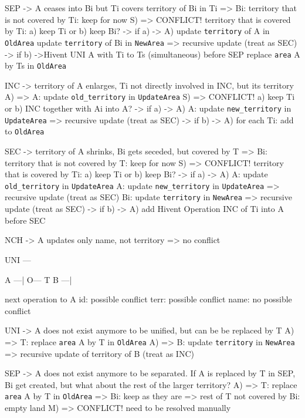   SEP -> A ceases into Bi but Ti covers territory of Bi in Ti
      => Bi: territory that is not covered by Ti: keep for now
S)    => CONFLICT! territory that is covered by Ti: a) keep Ti or b) keep Bi?
      -> if a)
-> A)   update \texttt{territory} of A in \texttt{OldArea}
        update \texttt{territory} of Bi in \texttt{NewArea}
        => recursive update (treat as SEC)
      -> if b)
->Hivent UNI A with Ti to Ts (simultaneous) before SEP
        replace \texttt{area} A by Ts in \texttt{OldArea}


  INC -> territory of A enlarges, Ti not directly involved in INC, but its territory
A)    => A: update \texttt{old\_territory} in \texttt{UpdateArea}
S)    => CONFLICT! a) keep Ti or b) INC together with Ai into A?
      -> if a)
-> A)   A: update \texttt{new\_territory} in \texttt{UpdateArea}
          => recursive update (treat as SEC)
      -> if b)
-> A)   for each Ti: add to \texttt{OldArea}

  SEC -> territory of A shrinks, Bi gets seceded, but covered by T
      => Bi: territory that is not covered by T: keep for now
S)    => CONFLICT! territory that is covered by Ti: a) keep Ti or b) keep Bi?
      -> if a)
-> A)   A: update \texttt{old\_territory} in \texttt{UpdateArea}
        A: update \texttt{new\_territory} in \texttt{UpdateArea}
          => recursive update (treat as SEC)
        Bi: update \texttt{territory} in \texttt{NewArea}
          => recursive update (treat as SEC)
      -> if b)
-> A)   add Hivent Operation INC of Ti into A before SEC

  NCH -> A updates only name, not territory
      => no conflict


UNI
---

A ---|
     O--- T
B ---|

next operation to A
  id:   possible conflict
  terr: possible conflict
  name: no possible conflict

  UNI -> A does not exist anymore to be unified, but can be be replaced by T
A)     => T: replace \texttt{area} A by T in \texttt{OldArea}
A)     => B: update \texttt{territory} in \texttt{NewArea}
        => recursive update of territory of B (treat as INC)

  SEP -> A does not exist anymore to be separated. If A is replaced by T in SEP, Bi get created, but what about the rest of the larger territory?
A)    => T: replace \texttt{area} A by T in \texttt{OldArea}
      => Bi: keep as they are
      => rest of T not covered by Bi: empty land
M)     => CONFLICT! need to be resolved manually


